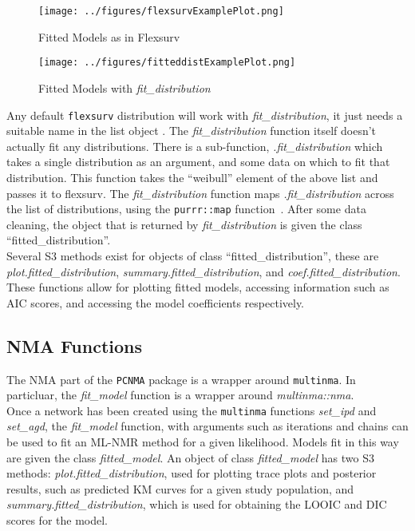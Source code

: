 \begin{figure}[h]
    \texttt{[image: ../figures/flexsurvExamplePlot.png]}
    \caption{Fitted Models as in Flexsurv}
    \label{fig:flexsurvlabelexample}
\end{figure}

\begin{figure}[h]
    \texttt{[image: ../figures/fitteddistExamplePlot.png]}
    \caption{Fitted Models with \textit{fit\_distribution}}
    \label{fig:fitdistributionexampleplot}
\end{figure}

Any default \verb|flexsurv| distribution will work with \textit{fit\_distribution}, it just needs a suitable name in the list object . The \textit{fit\_distribution} function itself doesn't actually fit any distributions. There is a sub-function, \textit{.fit\_distribution} which takes a single distribution as an argument, and some data on which to fit that distribution. This function takes the ``weibull'' element of the above list and passes it to flexsurv. The \textit{fit\_distribution} function maps \textit{.fit\_distribution} across the list of distributions, using the \verb|purrr::map| function~\cite{purrr}. After some data cleaning, the object that is returned by \textit{fit\_distribution} is given the class ``fitted\_distribution''.  \\

Several S3 methods exist for objects of class ``fitted\_distribution'', these are \textit{plot.fitted\_distribution}, \textit{summary.fitted\_distribution}, and \textit{coef.fitted\_distribution}. These functions allow for plotting fitted models, accessing information such as AIC scores, and accessing the model coefficients respectively.

\subsection{NMA Functions}
The NMA part of the \verb|PCNMA| package is a wrapper around \verb|multinma|. In particluar, the \textit{fit\_model} function is a wrapper around \textit{multinma::nma}. \\

Once a network has been created using the \verb|multinma| functions \textit{set\_ipd} and \textit{set\_agd}, the \textit{fit\_model} function, with arguments such as iterations and chains can be used to fit an ML-NMR method for a given likelihood. Models fit in this way are given the class \textit{fitted\_model}. An object of class \textit{fitted\_model} has two S3 methods: \textit{plot.fitted\_distribution}, used for plotting trace plots and posterior results, such as predicted KM curves for a given study population, and \textit{summary.fitted\_distribution}, which is used for obtaining the LOOIC and DIC scores for the model. \\


